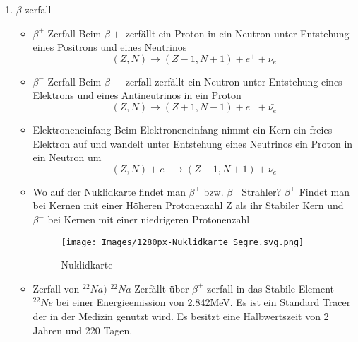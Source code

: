 \documentclass{article}
\begin{document}
\begin{enumerate}
            \item $\beta$-zerfall
            \begin{itemize}
                \item $\beta^+$-Zerfall
                    Beim $\beta+$ zerfällt ein Proton in ein Neutron unter Entstehung eines Positrons und eines Neutrinos
                    $$(Z,N) \rightarrow (Z-1,N+1) + e^+ + \nu_e$$
                \item $\beta^-$-Zerfall
                    Beim $\beta-$ zerfall zerfällt ein Neutron unter Entstehung eines Elektrons und eines Antineutrinos in ein Proton
                    $$(Z,N) \rightarrow (Z+1,N-1) + e^- + \bar{\nu_e}$$
                \item Elektroneneinfang
                    Beim Elektroneneinfang nimmt ein Kern ein freies Elektron auf und wandelt unter Entstehung eines Neutrinos ein Proton in ein Neutron um
                    $$(Z,N) + e^- \rightarrow (Z-1,N+1) + \nu_e$$
                \item Wo auf der Nuklidkarte findet man $\beta^+$ bzw. $\beta^-$ Strahler?
                    $\beta^+$ Findet man bei Kernen mit einer Höheren Protonenzahl Z als ihr Stabiler Kern und \newline
                    $\beta^-$ bei Kernen mit einer niedrigeren Protonenzahl
                    \begin{figure}[h]
                        \centering
                        \texttt{[image: Images/1280px-Nuklidkarte\_Segre.svg.png]}
                        \caption{Nuklidkarte}
                        \label{fig:Nuklidkarte}
                    \end{figure}
                \item Zerfall von $^{22}Na)$
                    $^{22}Na$ Zerfällt über $\beta^+$ zerfall in das Stabile Element $^{22}Ne$ bei einer Energieemission von 2.842MeV.
                    Es ist ein Standard Tracer der in der Medizin genutzt wird. Es besitzt eine Halbwertszeit von 2 Jahren und 220 Tagen.
            \end{itemize}


\end{enumerate}
\end{document}
